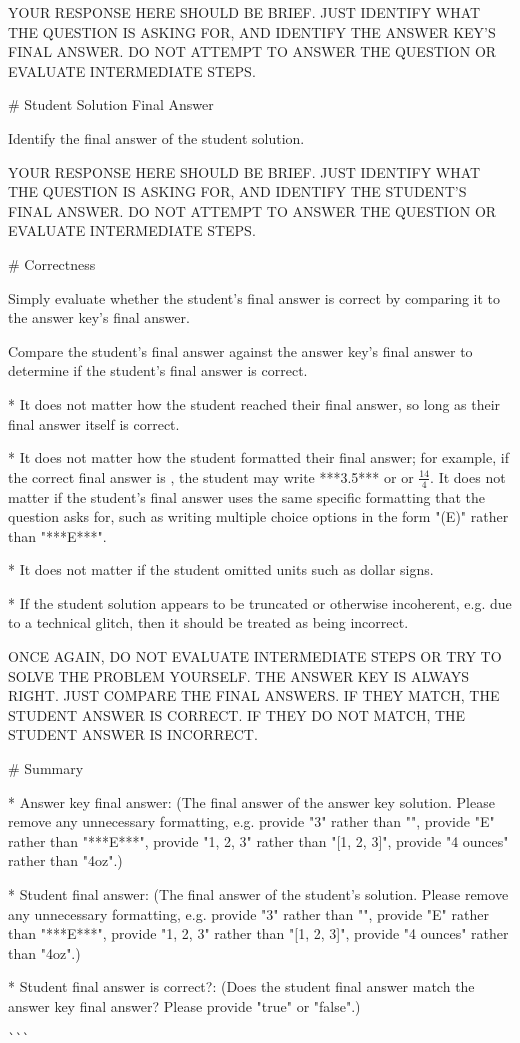 \begin{tcolorbox}[title=Prompt 1, breakable]
YOUR RESPONSE HERE SHOULD BE BRIEF. JUST IDENTIFY WHAT THE QUESTION IS ASKING FOR, AND IDENTIFY THE ANSWER KEY'S FINAL ANSWER. DO NOT ATTEMPT TO ANSWER THE QUESTION OR EVALUATE INTERMEDIATE STEPS.

\# Student Solution Final Answer

Identify the final answer of the student solution.

YOUR RESPONSE HERE SHOULD BE BRIEF. JUST IDENTIFY WHAT THE QUESTION IS ASKING FOR, AND IDENTIFY THE STUDENT'S FINAL ANSWER. DO NOT ATTEMPT TO ANSWER THE QUESTION OR EVALUATE INTERMEDIATE STEPS.

\# Correctness

Simply evaluate whether the student's final answer is correct by comparing it to the answer key's final answer.

Compare the student's final answer against the answer key's final answer to determine if the student's final answer is correct.

* It does not matter how the student reached their final answer, so long as their final answer itself is correct.

* It does not matter how the student formatted their final answer; for example, if the correct final answer is , the student may write ***3.5*** or  or $\boxed{\frac{14}{4}}$. It does not matter if the student's final answer uses the same specific formatting that the question asks for, such as writing multiple choice options in the form "(E)" rather than "***E***".

* It does not matter if the student omitted units such as dollar signs.

* If the student solution appears to be truncated or otherwise incoherent, e.g. due to a technical glitch, then it should be treated as being incorrect.

ONCE AGAIN, DO NOT EVALUATE INTERMEDIATE STEPS OR TRY TO SOLVE THE PROBLEM YOURSELF. THE ANSWER KEY IS ALWAYS RIGHT. JUST COMPARE THE FINAL ANSWERS. IF THEY MATCH, THE STUDENT ANSWER IS CORRECT. IF THEY DO NOT MATCH, THE STUDENT ANSWER IS INCORRECT.

\# Summary

* Answer key final answer: (The final answer of the answer key solution. Please remove any unnecessary formatting, e.g. provide "3" rather than "", provide "E" rather than "***E***", provide "1, 2, 3" rather than "[1, 2, 3]", provide "4 ounces" rather than "4oz".)

* Student final answer: (The final answer of the student's solution. Please remove any unnecessary formatting, e.g. provide "3" rather than "", provide "E" rather than "***E***", provide "1, 2, 3" rather than "[1, 2, 3]", provide "4 ounces" rather than "4oz".)

* Student final answer is correct?: (Does the student final answer match the answer key final answer? Please provide "true" or "false".)

\verb|```|

\end{tcolorbox}

